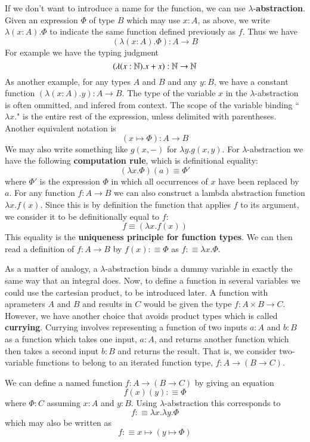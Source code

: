 If we don't want to introduce a name for the function, we can use $\lambda$-\textbf{abstraction}. Given an expression $\Phi$ of type $B$ which may use $x:A$, as above, we write $\lambda(x:A).\Phi$ to indicate the same function defined previously as $f$. Thus we have $$(\lambda(x:A).\Phi):A\rightarrow B$$
For example we have the typing judgment \begin{equation*}
    (\lambda(x:\mathbb N).x+x):\mathbb N\rightarrow \mathbb N
\end{equation*}
As another example, for any types $A$ and $B$ and any $y:B$, we have a constant function $(\lambda(x:A).y):A\rightarrow B$. The type of the variable $x$ in the $\lambda$-abstraction is often ommitted, and infered from context. The scope of the variable binding ``$\lambda x.$" is the entire rest of the expression, unless delimited with parentheses. Another equivalent notation is $$(x\mapsto \Phi):A\rightarrow B$$
We may also write something like $g(x,-)$ for $\lambda y.g(x,y)$. For $\lambda$-abstraction we have the following \textbf{computation rule}, which is definitional equality: $$(\lambda x.\Phi)(a) \equiv \Phi'$$ 
where $\Phi'$ is the expression $\Phi$ in which all occurrences of $x$ have been replaced by $a$. For any function $f:A\rightarrow B$ we can also construct a lambda abstraction function $\lambda x.f(x)$. Since this is by definition the function that applies $f$ to its argument, we consider it to be definitionally equal to $f$: $$f\equiv (\lambda x.f(x))$$
This equality is the \textbf{uniqueness principle for function types}. We can then read a definition of $f:A\rightarrow B$ by $f(x) :\equiv \Phi$ as $f :\equiv \lambda x.\Phi$. 

As a matter of analogy, a $\lambda$-abstraction binds a dummy variable in exactly the same way that an integral does. Now, to define a function in several variables we could use the cartesian product, to be introduced later. A function with aprameters $A$ and $B$ and results in $C$ would be given the type $f:A\times B\rightarrow C$. However, we have another choice that avoids product types which is called \textbf{currying}. Currying involves representing a function of two inputs $a:A$ and $b:B$ as a function which takes one input, $a:A$, and returns another function which then takes a second input $b:B$ and returns the result. That is, we consider two-variable functions to belong to an iterated function type, $f:A\rightarrow (B\rightarrow C)$.

We can define a named function $f:A\rightarrow (B\rightarrow C)$ by giving an equation $$f(x)(y):\equiv \Phi$$ 
where $\Phi:C$ assuming $x:A$ and $y:B$. Using $\lambda$-abstraction this corresponds to $$f:\equiv \lambda x.\lambda y.\Phi$$
which may also be written as \begin{equation*}
    f : \equiv x\mapsto (y\mapsto \Phi)
\end{equation*}


